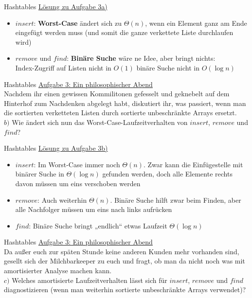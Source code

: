 \begin{frame}{Hashtables}
	\underline{Lösung zu Aufgabe 3a)}
	\\
	\begin{itemize}
		\item $insert$: \textbf{Worst-Case} ändert sich zu $\Theta(n)$, wenn ein Element ganz am Ende eingefügt werden muss (und somit die ganze verkettete Liste durchlaufen wird)
		\item $remove$ und $find$: \textbf{Binäre Suche} wäre ne Idee, aber bringt nichts: \\
		Index-Zugriff auf Listen nicht in $O(1)$ \impl binäre Suche nicht in $O(\log n)$
	\end{itemize}
\end{frame}


\begin{frame}{Hashtables}
	\underline{Aufgabe 3: Ein philosophischer Abend}
	\\
	Nachdem ihr einen gewissen Kommilitonen gefesselt und geknebelt auf dem Hinterhof zum Nachdenken abgelegt habt, diskutiert ihr, was passiert, wenn man die sortierten verketteten Listen durch sortierte unbeschränkte Arrays ersetzt.
	\\
	$b)$ Wie ändert sich nun das Worst-Case-Laufzeitverhalten von $insert$, $remove$ und $find$?
\end{frame}

\begin{frame}{Hashtables}
	\underline{Lösung zu Aufgabe 3b)}
	\begin{itemize}
		\item $insert$: Im Worst-Case immer noch $\Theta(n)$. Zwar kann die Einfügestelle mit binärer Suche in $\Theta( \log n)$ gefunden werden, doch alle Elemente rechts davon müssen um eins verschoben werden
		\pause
		\item $remove$: Auch weiterhin $\Theta(n)$. Binäre Suche hilft zwar beim Finden, aber alle Nachfolger müssen um eins nach links aufrücken
		\pause
		\item $find$: Binäre Suche bringt „endlich“ etwas \impl Laufzeit $\Theta( \log n)$
	\end{itemize}
\end{frame}


\begin{frame}{Hashtables}
	\underline{Aufgabe 3: Ein philosophischer Abend}
	\\
	Da außer euch zur späten Stunde keine anderen Kunden mehr vorhanden sind, gesellt sich der Milchbarkeeper zu euch und fragt, ob man da nicht noch was mit amortisierter Analyse machen kann.
	\\
	$c)$ Welches amortisierte Laufzeitverhalten lässt sich für $insert$, $remove$ und $find$ diagnostizieren (wenn man weiterhin sortierte unbeschränkte Arrays verwendet)?
\end{frame}

